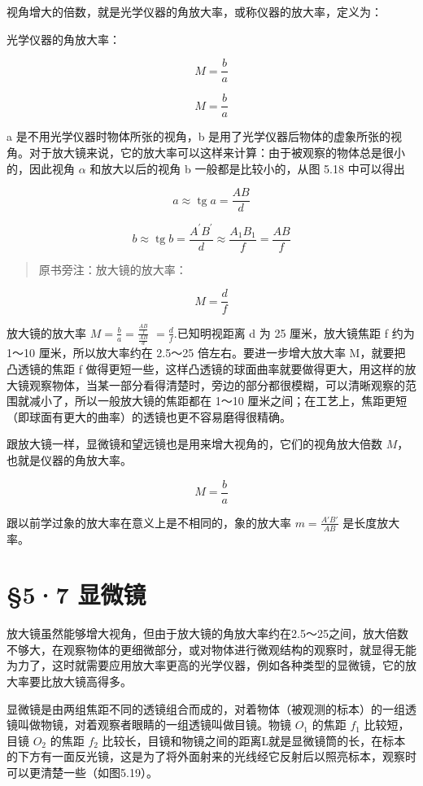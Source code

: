 视角增大的倍数，就是光学仪器的角放大率，或称仪器的放大率，定义为：

光学仪器的角放大率：

\[
M = \frac {b}{a}
\]

\[
M = \frac {b}{a}
\]

a 是不用光学仪器时物体所张的视角，b
是用了光学仪器后物体的虚象所张的视角。对于放大镜来说，它的放大率可以这样来计算：由于被观察的物体总是很小的，因此视角
\(\alpha\) 和放大以后的视角 b 一般都是比较小的，从图 5.18 中可以得出

\[
a \approx \operatorname{tg} a = \frac {A B}{d}
\]

\[
b \approx \operatorname{tg} b = \frac {A ^ {\prime} B ^ {\prime}}{d} \approx \frac {A _ {1} B _ {1}}{f} = \frac {A B}{f}
\]

\begin{quote}
原书旁注：放大镜的放大率：
\end{quote}

\[
M = \frac {d}{f}
\]

放大镜的放大率 \(M=\frac{b}{a}=\frac{\frac{AB}{f}}{\frac{AB}{d}}\)
\(=\frac{d}{f}.\)已知明视距离 d 为 25 厘米，放大镜焦距 f 约为 1～10
厘米，所以放大率约在 2.5～25 倍左右。要进一步增大放大率
M，就要把凸透镜的焦距 f
做得更短一些，这样凸透镜的球面曲率就要做得更大，用这样的放大镜观察物体，当某一部分看得清楚时，旁边的部分都很模糊，可以清晰观察的范围就减小了，所以一般放大镜的焦距都在
1～10
厘米之间；在工艺上，焦距更短（即球面有更大的曲率）的透镜也更不容易磨得很精确。

跟放大镜一样，显微镜和望远镜也是用来增大视角的，它们的视角放大倍数
\(M\)，也就是仪器的角放大率。

\[
M = \frac {b}{a}
\]

跟以前学过象的放大率在意义上是不相同的，象的放大率 \(m=\frac{A'B'}{AB}\)
是长度放大率。

\section{§5·7 显微镜}

放大镜虽然能够增大视角，但由于放大镜的角放大率约在2.5～25之间，放大倍数不够大，在观察物体的更细微部分，或对物体进行微观结构的观察时，就显得无能为力了，这时就需要应用放大率更高的光学仪器，例如各种类型的显微镜，它的放大率要比放大镜高得多。

显微镜是由两组焦距不同的透镜组合而成的，对着物体（被观测的标本）的一组透镜叫做物镜，对着观察者眼睛的一组透镜叫做目镜。物镜
\(O_{1}\) 的焦距 \(f_{1}\) 比较短，目镜 \(O_{2}\) 的焦距 \(f_{2}\)
比较长，目镜和物镜之间的距离L就是显微镜筒的长，在标本的下方有一面反光镜，这是为了将外面射来的光线经它反射后以照亮标本，观察时可以更清楚一些（如图5.19）。

